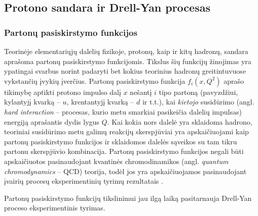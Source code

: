 \documentclass[a4paper, 12pt]{article}
\newlength\q
\begin{document}
\subsection{Protono sandara ir Drell-Yan procesas}


\subsubsection{Partonų pasiskirstymo funkcijos}

Teorinėje elementariųjų dalelių fizikoje, protonų, kaip ir kitų hadronų, sandara aprašoma
partonų pasiskirstymo funkcijomis. Tikslus šių funkcijų žinojimas yra ypatingai svarbus
norint padaryti bet kokius teorinius hadronų greitintuvuose vykstančių įvykių įverčius.
Partonų pasiskirstymo funkcija $f_{i}(x, Q^{2})$ aprašo tikimybę aptikti protono impulso
dalį $x$ nešantį $i$ tipo partoną (pavyzdžiui, kylantyjį kvarką -- $u$, krentantyjį
kvarką -- $d$ ir t.t.), kai \textit{kietojo} susidūrimo (angl. \textit{hard interaction} --
procesas, kurio metu smarkiai pasikeičia dalelių impulsas) energiją aprašantis dydis lygus $Q$.
Kai kokia nors dalelė yra sklaidoma hadrono, teoriniai susidūrimo metu galimų reakcijų
skerspjūviai yra apskaičiuojami kaip partonų pasiskirstymo funkcijos ir sklaidomos dalelės
sąveikos su tam tikru partonu skerspjūvio kombinacija.
Partonų pasiskirstymo funkcijos negali būti apskaičiuotos pasinaudojant kvantinės chromodinamikos
(angl. \textit{quantum chromodynamics} -- QCD) teorija, todėl jos yra apskaičiuojamos
pasinaudojant įvairių procesų eksperimentinių tyrimų rezultatais \cite{Placakyte:2011az}.

Partonų pasiskirstymo funkcijų tikslinimui jau ilgą laiką pasitarnauja Drell-Yan proceso eksperimentinis
tyrimas. 
\end{document}
